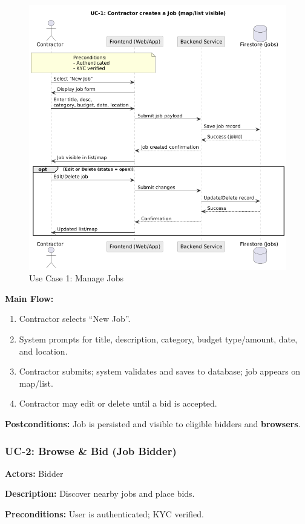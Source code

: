 \documentclass[11pt]{article}
\begin{document}
\begin{figure}[H]
  \centering
  \includegraphics[width=0.9\linewidth]{UC-1.png}
  \caption{Use Case 1: Manage Jobs}
  \label{fig:uc1}
\end{figure}

\textbf{Main Flow:}
\begin{enumerate}[leftmargin=1.4em]
  \item Contractor selects ``New Job''.
  \item System prompts for title, description, category, budget type/amount, date, and location.
  \item Contractor submits; system validates and saves to database; job appears on map/list.
  \item Contractor may edit or delete until a bid is accepted.
\end{enumerate}
\textbf{Postconditions:} Job is persisted and visible to eligible bidders and \textbf{browsers}.

\subsubsection*{UC-2: Browse \& Bid (Job Bidder)}
\textbf{Actors:} Bidder \par
\textbf{Description:} Discover nearby jobs and place bids. \par
\textbf{Preconditions:} User is authenticated; KYC verified. \par
\end{document}
